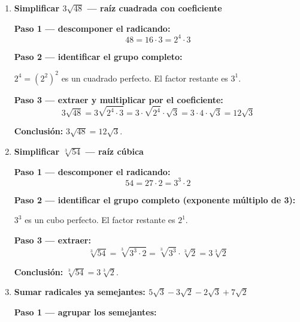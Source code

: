 \documentclass[11pt, letterpaper]{article}
\begin{document}
\begin{tcolorbox}[examplebox, title={Ejemplos}]
\begin{enumerate}[label=\textbf{Ej. \arabic*.}, leftmargin=*, itemsep=18pt]
\textbf{Paso 1 — descomponer en factores primos:}
$$72 = 8 \cdot 9 = 2^3 \cdot 3^2$$

\textbf{Paso 2 — separar los exponentes en grupos completos (pares) e incompletos:}
$$72 = 2^2 \cdot 2 \cdot 3^2$$

Los grupos completos son $2^2$ y $3^2$; el factor restante es $2^1$.

\textbf{Paso 3 — extraer los grupos completos fuera del radical:}
$$\sqrt{72} = \sqrt{2^2 \cdot 3^2 \cdot 2} = \sqrt{2^2} \cdot \sqrt{3^2} \cdot \sqrt{2} = 2 \cdot 3 \cdot \sqrt{2} = 6\sqrt{2}$$

\textbf{Conclusión:} $\sqrt{72} = 6\sqrt{2}$.

\item \textbf{Simplificar $3\sqrt{48}$ — raíz cuadrada con coeficiente}

\textbf{Paso 1 — descomponer el radicando:}
$$48 = 16 \cdot 3 = 2^4 \cdot 3$$

\textbf{Paso 2 — identificar el grupo completo:}

$2^4 = (2^2)^2$ es un cuadrado perfecto. El factor restante es $3^1$.

\textbf{Paso 3 — extraer y multiplicar por el coeficiente:}
$$3\sqrt{48} = 3\sqrt{2^4 \cdot 3} = 3 \cdot \sqrt{2^4} \cdot \sqrt{3} = 3 \cdot 4 \cdot \sqrt{3} = 12\sqrt{3}$$

\textbf{Conclusión:} $3\sqrt{48} = 12\sqrt{3}$.

\item \textbf{Simplificar $\sqrt[3]{54}$ — raíz cúbica}

\textbf{Paso 1 — descomponer el radicando:}
$$54 = 27 \cdot 2 = 3^3 \cdot 2$$

\textbf{Paso 2 — identificar el grupo completo (exponente múltiplo de 3):}

$3^3$ es un cubo perfecto. El factor restante es $2^1$.

\textbf{Paso 3 — extraer:}
$$\sqrt[3]{54} = \sqrt[3]{3^3 \cdot 2} = \sqrt[3]{3^3} \cdot \sqrt[3]{2} = 3\sqrt[3]{2}$$

\textbf{Conclusión:} $\sqrt[3]{54} = 3\sqrt[3]{2}$.

\item \textbf{Sumar radicales ya semejantes: $5\sqrt{3} - 3\sqrt{2} - 2\sqrt{3} + 7\sqrt{2}$}

\textbf{Paso 1 — agrupar los semejantes:}


\end{enumerate}
\end{tcolorbox}
\end{document}
